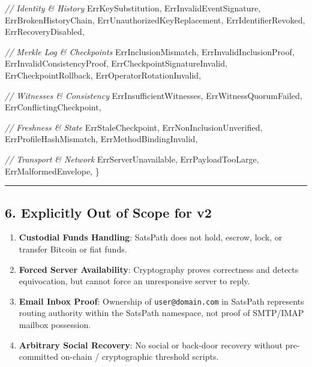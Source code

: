 \documentclass[
]{article}
\newenvironment{Shaded}{}{}
\newcommand{\CommentTok}[1]{\textcolor[rgb]{0.38,0.63,0.69}{\textit{#1}}}
\newcommand{\NormalTok}[1]{#1}
\newcommand{\OperatorTok}[1]{\textcolor[rgb]{0.40,0.40,0.40}{#1}}
\providecommand{\tightlist}{%
  \setlength{\itemsep}{0pt}\setlength{\parskip}{0pt}}
\begin{document}
\begin{Shaded}
\begin{Highlighting}[]
    \CommentTok{// Identity \& History}
\NormalTok{    ErrKeySubstitution}\OperatorTok{,}
\NormalTok{    ErrInvalidEventSignature}\OperatorTok{,}
\NormalTok{    ErrBrokenHistoryChain}\OperatorTok{,}
\NormalTok{    ErrUnauthorizedKeyReplacement}\OperatorTok{,}
\NormalTok{    ErrIdentifierRevoked}\OperatorTok{,}
\NormalTok{    ErrRecoveryDisabled}\OperatorTok{,}

    \CommentTok{// Merkle Log \& Checkpoints}
\NormalTok{    ErrInclusionMismatch}\OperatorTok{,}
\NormalTok{    ErrInvalidInclusionProof}\OperatorTok{,}
\NormalTok{    ErrInvalidConsistencyProof}\OperatorTok{,}
\NormalTok{    ErrCheckpointSignatureInvalid}\OperatorTok{,}
\NormalTok{    ErrCheckpointRollback}\OperatorTok{,}
\NormalTok{    ErrOperatorRotationInvalid}\OperatorTok{,}

    \CommentTok{// Witnesses \& Consistency}
\NormalTok{    ErrInsufficientWitnesses}\OperatorTok{,}
\NormalTok{    ErrWitnessQuorumFailed}\OperatorTok{,}
\NormalTok{    ErrConflictingCheckpoint}\OperatorTok{,}

    \CommentTok{// Freshness \& State}
\NormalTok{    ErrStaleCheckpoint}\OperatorTok{,}
\NormalTok{    ErrNonInclusionUnverified}\OperatorTok{,}
\NormalTok{    ErrProfileHashMismatch}\OperatorTok{,}
\NormalTok{    ErrMethodBindingInvalid}\OperatorTok{,}

    \CommentTok{// Transport \& Network}
\NormalTok{    ErrServerUnavailable}\OperatorTok{,}
\NormalTok{    ErrPayloadTooLarge}\OperatorTok{,}
\NormalTok{    ErrMalformedEnvelope}\OperatorTok{,}
\OperatorTok{\}}
\end{Highlighting}
\end{Shaded}

\begin{center}\rule{0.5\linewidth}{0.5pt}\end{center}

\hypertarget{explicitly-out-of-scope-for-v2}{%
\subsection{6. Explicitly Out of Scope for
v2}\label{explicitly-out-of-scope-for-v2}}

\begin{enumerate}
\def\labelenumi{\arabic{enumi}.}
\tightlist
\item
  \textbf{Custodial Funds Handling}: SatsPath does not hold, escrow,
  lock, or transfer Bitcoin or fiat funds.
\item
  \textbf{Forced Server Availability}: Cryptography proves correctness
  and detects equivocation, but cannot force an unresponsive server to
  reply.
\item
  \textbf{Email Inbox Proof}: Ownership of \texttt{user@domain.com} in
  SatsPath represents routing authority within the SatsPath namespace,
  not proof of SMTP/IMAP mailbox possession.
\item
  \textbf{Arbitrary Social Recovery}: No social or back-door recovery
  without pre-committed on-chain / cryptographic threshold scripts.
\end{enumerate}
\end{document}
